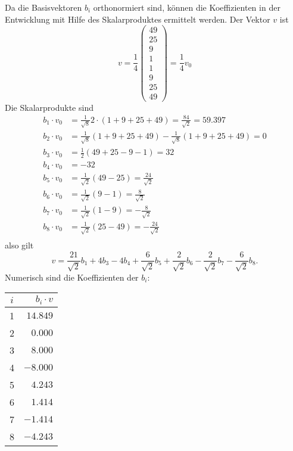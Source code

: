 \begin{loesung}
Da die Basisvektoren $b_i$ orthonormiert sind, können die Koeffizienten
in der Entwicklung mit Hilfe des Skalarproduktes ermittelt werden. Der
Vektor $v$ ist
\[
v=\frac14\begin{pmatrix}
49\\
25\\
9\\
1\\
1\\
9\\
25\\
49
\end{pmatrix}
=\frac14v_0
\]
Die Skalarprodukte sind
\begin{align*}
b_1\cdot v_0&=\frac1{\sqrt{8}}2\cdot(1+9+25+49)=\frac{84}{\sqrt{2}}=59.397\\
b_2\cdot v_0&=\frac1{\sqrt{8}}(1+9+25+49)-\frac1{\sqrt{8}}(1+9+25+49)=0\\
b_3\cdot v_0&=\frac12(49+25-9-1)=32\\
b_4\cdot v_0&=-32\\
b_5\cdot v_0&=\frac1{\sqrt{2}}(49-25)=\frac{24}{\sqrt{2}}\\
b_6\cdot v_0&=\frac1{\sqrt{2}}(9-1)=\frac{8}{\sqrt{2}}\\
b_7\cdot v_0&=\frac1{\sqrt{2}}(1-9)=-\frac{8}{\sqrt{2}}\\
b_8\cdot v_0&=\frac1{\sqrt{2}}(25-49)=-\frac{24}{\sqrt{2}}\\
\end{align*}
also gilt
\[
v=
\frac{21}{\sqrt{2}}b_1
+
4b_3
-4b_4
+\frac{6}{\sqrt{2}}b_5
+\frac{2}{\sqrt{2}}b_6
-\frac{2}{\sqrt{2}}b_7
-\frac{6}{\sqrt{2}}b_8.
\]
Numerisch sind die Koeffizienten der $b_i$:
\begin{center}
\begin{tabular}{|c|r|}
\hline
$i$&$b_i\cdot v$\\
\hline
1&$14.849$\\
2&$ 0.000$\\
3&$ 8.000$\\
4&$-8.000$\\
5&$ 4.243$\\
6&$ 1.414$\\
7&$-1.414$\\
8&$-4.243$\\
\hline
\end{tabular}
\end{center}
\end{loesung}

